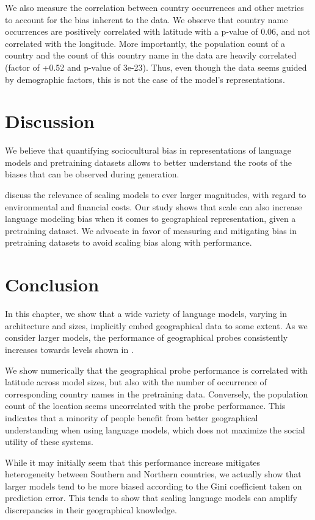 We also measure the correlation between country occurrences and other metrics to account for the bias inherent to the data. We observe that country name occurrences are positively correlated with latitude with a p-value of 0.06, and not correlated with the longitude. More importantly, the population count of a country and the count of this country name in the data are heavily correlated (factor of +0.52 and p-value of 3e-23). Thus, even though the data seems guided by demographic factors, this is not the case of the model's representations.

\section{Discussion}
\label{sec:discussion}
We believe that quantifying sociocultural bias in representations of language models and pretraining datasets allows to better understand the roots of the biases that can be observed during generation.

\citet{parrots_bender} discuss the relevance of scaling models to ever larger magnitudes, with regard to environmental and financial costs. Our study shows that scale can also increase language modeling bias when it comes to geographical representation, given a pretraining dataset. We advocate in favor of measuring and mitigating bias in pretraining datasets to avoid scaling bias along with performance.

\section*{Conclusion}
In this chapter, we show that a wide variety of language models, varying in architecture and sizes, implicitly embed geographical data to some extent. As we consider larger models, the performance of geographical probes consistently increases towards levels shown in \citet{gurnee2023language}.

We show numerically that the geographical probe performance is correlated with latitude across model sizes, but also with the number of occurrence of corresponding country names in the pretraining data. Conversely, the population count of the location seems uncorrelated with the probe performance. This indicates that a minority of people benefit from better geographical understanding when using language models, which does not maximize the social utility of these systems.

While it may initially seem that this performance increase mitigates heterogeneity between Southern and Northern countries, we actually show that larger models tend to be more biased according to the Gini coefficient taken on prediction error. This tends to show that scaling language models can amplify discrepancies in their geographical knowledge.

